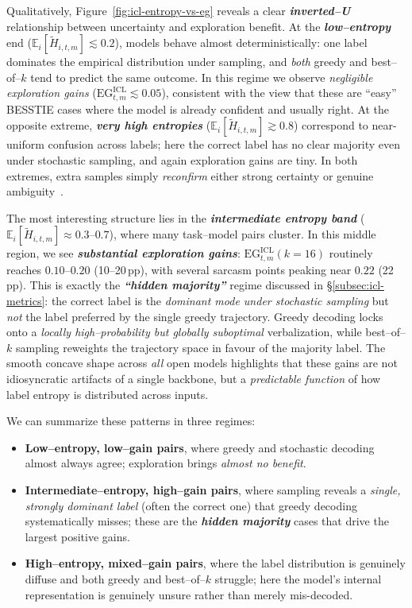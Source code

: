 \medskip
\noindent
Qualitatively, Figure~\ref{fig:icl-entropy-vs-eg} reveals a clear
\emph{\textbf{inverted--U}} relationship between uncertainty and
exploration benefit.  At the \emph{\textbf{low--entropy}} end
($\mathbb{E}_i[\widetilde{H}_{i,t,m}] \lesssim 0.2$), models behave
almost deterministically: one label dominates the empirical distribution
under sampling, and \emph{both} greedy and best--of--$k$ tend to predict
the same outcome.  In this regime we observe \emph{negligible exploration
gains} ($\mathrm{EG}^{\mathrm{ICL}}_{t,m} \lesssim 0.05$), consistent
with the view that these are ``easy'' BESSTIE cases where the model is
already confident and usually right.  At the opposite extreme,
\emph{\textbf{very high entropies}}
($\mathbb{E}_i[\widetilde{H}_{i,t,m}] \gtrsim 0.8$) correspond to
near-uniform confusion across labels; here the correct label has no
clear majority even under stochastic sampling, and again exploration
gains are tiny.  In both extremes, extra samples simply \emph{reconfirm}
either strong certainty or genuine ambiguity~\citep{guo2017calibration}.

The most interesting structure lies in the \emph{\textbf{intermediate
entropy band}} ($\mathbb{E}_i[\widetilde{H}_{i,t,m}] \approx 0.3$--$0.7$),
where many task--model pairs cluster.  In this middle region, we see
\emph{\textbf{substantial exploration gains}}:
$\mathrm{EG}^{\mathrm{ICL}}_{t,m}(k{=}16)$ routinely reaches
$0.10$--$0.20$ (10--20\,pp), with several sarcasm points peaking near
$0.22$ (22\,pp).  This is exactly the \emph{\textbf{``hidden majority''}}
regime discussed in \S\ref{subsec:icl-metrics}: the correct label is the
\emph{dominant mode under stochastic sampling} but \emph{not} the label
preferred by the single greedy trajectory.  Greedy decoding locks onto a
\emph{locally high--probability but globally suboptimal} verbalization,
while best--of--$k$ sampling reweights the trajectory space in favour of
the majority label.  The smooth concave shape across \emph{all} open
models highlights that these gains are not idiosyncratic artifacts of a
single backbone, but a \emph{predictable function} of how label entropy
is distributed across inputs.

\medskip
\noindent
We can summarize these patterns in three regimes:
\begin{itemize}[leftmargin=1.5em]
  \item \textbf{Low--entropy, low--gain pairs}, where greedy and
        stochastic decoding almost always agree; exploration brings
        \emph{almost no benefit}.
  \item \textbf{Intermediate--entropy, high--gain pairs}, where sampling
        reveals a \emph{single, strongly dominant label} (often the
        correct one) that greedy decoding systematically misses; these
        are the \emph{\textbf{hidden majority}} cases that drive the
        largest positive gains.
  \item \textbf{High--entropy, mixed--gain pairs}, where the label
        distribution is genuinely diffuse and both greedy and
        best--of--$k$ struggle; here the model’s internal
        representation is genuinely unsure rather than merely
        mis-decoded.
\end{itemize}


